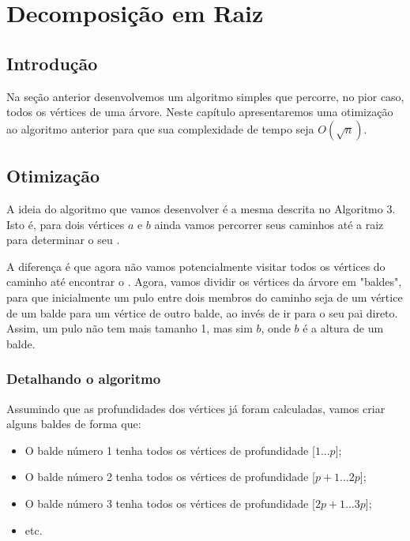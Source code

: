 \chapter{Decomposição em Raiz}
\label{cap:decomp-raiz}

\section{Introdução}

Na seção anterior desenvolvemos um algoritmo simples que percorre, no pior caso, todos os vértices de uma árvore. Neste capítulo apresentaremos uma otimização ao algoritmo anterior para que sua complexidade de tempo seja $O(\sqrt{n})$.

\section{Otimização}

A ideia do algoritmo que vamos desenvolver é a mesma descrita no Algoritmo 3. Isto é, para dois vértices $a$ e $b$ ainda vamos percorrer seus caminhos até a raiz para determinar o seu \LCA.

A diferença é que agora não vamos potencialmente visitar todos os vértices do caminho até encontrar o \LCA. Agora, vamos dividir os vértices da árvore em "baldes", para que inicialmente um pulo entre dois membros do caminho seja de um vértice de um balde para um vértice de outro balde, ao invés de ir para o seu pai direto. Assim, um pulo não tem mais tamanho 1, mas sim $b$, onde $b$ é a altura de um balde.

\subsection{Detalhando o algoritmo}

Assumindo que as profundidades dos vértices já foram calculadas, vamos criar alguns baldes de forma que:

\begin{itemize}
    \item O balde número 1 tenha todos os vértices de profundidade [$1$...$p$];
    \item O balde número 2 tenha todos os vértices de profundidade [$p+1$...$2p$];
    \item O balde número 3 tenha todos os vértices de profundidade [$2p+1$...$3p$];
    \item etc.
\end{itemize}

